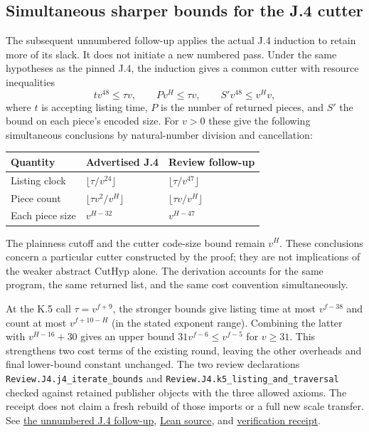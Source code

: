 \documentclass[11pt,letterpaper]{article}
\theoremstyle{definition}\newtheorem{definition}[theorem]{Definition}\newtheorem{example}[theorem]{Example}
\theoremstyle{remark}\newtheorem{remark}[theorem]{Remark}
\newcommand{\follow}[2]{\href{https://github.com/nousentllc/VP-VNP-Review/blob/8a7976933b6b2b4ffda1ad3a0dfb5fc6b6f023e8/#1}{#2}}
\begin{document}
\subsection{Simultaneous sharper bounds for the J.4 cutter}\label{sec:j4tight}
The subsequent unnumbered follow-up applies the actual J.4 induction to retain more of its slack. It does not initiate a new numbered pass. Under the same hypotheses as the pinned J.4, the induction gives a common cutter with resource inequalities
\[
 t v^{48}\le \tau v,\qquad Pv^H\le\tau v,\qquad S'v^{48}\le v^H v,
\]
where $t$ is accepting listing time, $P$ is the number of returned pieces, and $S'$ the bound on each piece's encoded size. For $v>0$ these give the following simultaneous conclusions by natural-number division and cancellation:
\begin{center}
\begin{tabular}{@{}lll@{}}\toprule
Quantity & Advertised J.4 & Review follow-up \\\midrule
Listing clock & $\lfloor\tau/v^{24}\rfloor$ & $\lfloor\tau/v^{47}\rfloor$\\
Piece count & $\lfloor\tau v^2/v^H\rfloor$ & $\lfloor\tau v/v^H\rfloor$\\
Each piece size & $v^{H-32}$ & $v^{H-47}$\\
\bottomrule\end{tabular}
\end{center}
The plainness cutoff and the cutter code-size bound remain $v^H$. These conclusions concern a particular cutter constructed by the proof; they are not implications of the weaker abstract CutHyp alone. The derivation accounts for the same program, the same returned list, and the same cost convention simultaneously.

At the K.5 call $\tau=v^{f+9}$, the stronger bounds give listing time at most $v^{f-38}$ and count at most $v^{f+10-H}$ (in the stated exponent range). Combining the latter with $v^{H-16}+30$ gives an upper bound $31v^{f-6}\le v^{f-5}$ for $v\ge31$. This strengthens two cost terms of the existing round, leaving the other overheads and final lower-bound constant unchanged. The two review declarations \texttt{Review.J4.j4\_iterate\_bounds} and \texttt{Review.J4.k5\_listing\_and\_traversal} checked against retained publisher objects with the three allowed axioms. The receipt does not claim a fresh rebuild of those imports or a full new scale transfer. See \follow{followups/j4/README.md}{the unnumbered J.4 follow-up}, \follow{followups/j4/J4_Followup.lean}{Lean source}, and \follow{followups/j4/verification.json}{verification receipt}.
\end{document}
